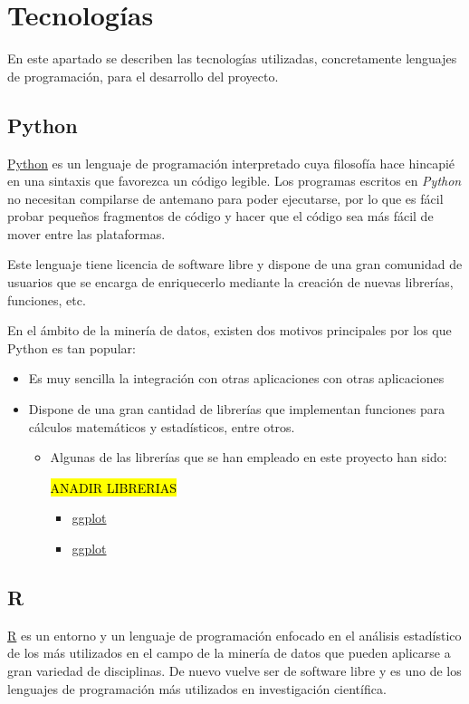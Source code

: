 \section{Tecnologías}\label{tecnologias}
 En este apartado se describen las tecnologías utilizadas, concretamente lenguajes de programación, para el desarrollo del proyecto. 
 
 \subsection{Python}\label{tecnologias_python}
 
 \href{python.org}{Python} es un lenguaje de programación interpretado cuya filosofía hace hincapié en una sintaxis que favorezca un código legible. Los programas escritos en\textit{ Python} no necesitan compilarse de antemano para poder ejecutarse, por lo que es fácil probar pequeños fragmentos de código y hacer que el código sea más fácil de mover entre las plataformas.
 
Este lenguaje tiene licencia de software libre y dispone de una gran comunidad de usuarios que se encarga de enriquecerlo mediante la creación de nuevas librerías, funciones, etc. 

En el ámbito de la minería de datos, existen dos motivos principales por los que Python es tan popular:  	
\begin{itemize}
	\item Es muy sencilla la integración con otras aplicaciones con otras aplicaciones
	\item Dispone de una gran cantidad de librerías que implementan funciones para cálculos matemáticos y estadísticos, entre otros.
	 \begin{itemize}
		\item Algunas de las librerías que se han empleado en este proyecto han sido:
		
		 \hl{ANADIR LIBRERIAS}
		\begin{itemize}
			\item \href{https://www.qlik.com/us}{ggplot} 
			\item \href{https://www.qlik.com/us}{ggplot} 
		\end{itemize}
\end{itemize}


\end{itemize}
  \subsection{R}\label{tecnologias_R}
  \href{r-project.org}{R} es un entorno y un lenguaje de programación enfocado en el análisis estadístico de los más utilizados en el campo de la minería de datos que pueden aplicarse a gran variedad de disciplinas. De nuevo vuelve ser de software libre y es uno de los lenguajes de programación más utilizados en investigación científica.
  
